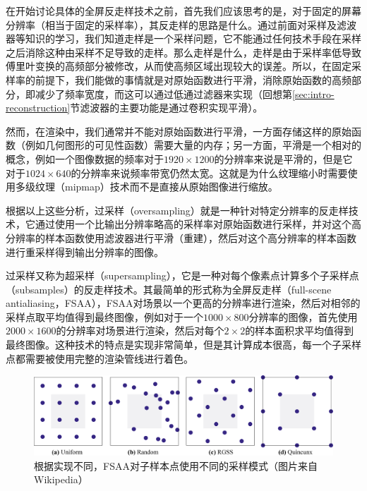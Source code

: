 在开始讨论具体的全屏反走样技术之前，首先我们应该思考的是，对于固定的屏幕分辨率（相当于固定的采样率），其反走样的思路是什么。通过前面对采样及滤波器等知识的学习，我们知道走样是一个采样问题，它不能通过任何技术手段在采样之后消除这种由采样不足导致的走样。那么走样是什么，走样是由于采样率低导致傅里叶变换的高频部分被修改，从而使高频区域出现较大的误差。所以，在固定采样率的前提下，我们能做的事情就是对原始函数进行平滑，消除原始函数的高频部分，即减少了频率宽度，而这可以通过低通过滤器来实现（回想第\ref{sec:intro-reconstruction}节滤波器的主要功能是通过卷积实现平滑）。

然而，在渲染中，我们通常并不能对原始函数进行平滑，一方面存储这样的原始函数（例如几何图形的可见性函数）需要大量的内存；另一方面，平滑是一个相对的概念，例如一个图像数据的频率对于$1920\times 1200$的分辨率来说是平滑的，但是它对于$1024\times 640$的分辨率来说频率带宽仍然太宽。这就是为什么纹理缩小时需要使用多级纹理（mipmap）技术而不是直接从原始图像进行缩放。

根据以上这些分析，过采样（oversampling）就是一种针对特定分辨率的反走样技术，它通过使用一个比输出分辨率略高的采样率对原始函数进行采样，并对这个高分辨率的样本函数使用滤波器进行平滑（重建），然后对这个高分辨率的样本函数进行重采样得到输出分辨率的图像。

过采样又称为超采样（supersampling），它是一种对每个像素点计算多个子采样点（subsamples）的反走样技术。其最简单的形式称为全屏反走样（full-scene antialiasing，FSAA），FSAA对场景以一个更高的分辨率进行渲染，然后对相邻的采样点取平均值得到最终图像，例如对于一个$1000\times 800$分辨率的图像，首先使用$2000\times 1600$的分辨率对场景进行渲染，然后对每个$2\times 2$的样本面积求平均值得到最终图像。这种技术的特点是实现非常简单，但是其计算成本很高，每一个子采样点都需要被使用完整的渲染管线进行着色。

\begin{figure}
\begin{fullwidth}
	\includegraphics[width=\thewidth]{figures/intro/sampling-pattern}
\caption{根据实现不同，FSAA对子样本点使用不同的采样模式（图片来自Wikipedia）}
\label{f:intro-Supersampling-pattern}
\end{fullwidth}
\end{figure}

